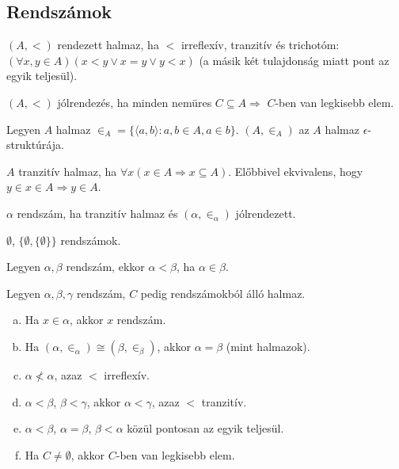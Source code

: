 \subsection{Rendszámok}
\begin{defi}
$(A, <)$ rendezett halmaz, ha $<$ irreflexív, tranzitív és trichotóm: $(\forall x,y \in A) (x < y \lor x = y \lor y < x)$ (a másik két tulajdonság miatt pont az egyik teljesül).
\end{defi}
\begin{defi}
$(A, <)$ jólrendezés, ha minden nemüres $C \subseteq A \Rightarrow$ $C$-ben van legkisebb elem.
\end{defi}
\begin{defi} Legyen $A$ halmaz $\in_{A} = \lbrace \langle a, b \rangle : a, b \in A, a \in b \rbrace$. $(A,\in_A)$ az $A$ halmaz $\epsilon$-struktúrája.
\end{defi}
\begin{defi}
$A$ tranzitív halmaz, ha $\forall x (x \in A \Rightarrow x \subseteq A)$. Előbbivel ekvivalens, hogy $y \in x \in A \Rightarrow y \in A$.
\end{defi}
\begin{defi} $\alpha$ rendszám, ha tranzitív halmaz és $(\alpha, \in_\alpha)$ jólrendezett.
\end{defi}
\begin{exmpl} $\emptyset$, $\lbrace \emptyset, \lbrace \emptyset \rbrace \rbrace$ rendszámok.
\end{exmpl}
\begin{defi} Legyen $\alpha, \beta$ rendszám, ekkor $\alpha < \beta$, ha $\alpha \in \beta$.
\end{defi}
\begin{theo} Legyen $\alpha, \beta, \gamma$ rendszám, $C$ pedig rendszámokból álló halmaz.
\begin{enumerate}[(a)]
\item Ha $x \in \alpha$, akkor $x$ rendszám.
\item Ha $(\alpha, \in_\alpha) \cong (\beta, \in_\beta)$, akkor $\alpha = \beta$ (mint halmazok).
\item $\alpha \not < \alpha$, azaz $<$ irreflexív.
\item $\alpha < \beta$, $\beta < \gamma$, akkor $\alpha < \gamma$, azaz $<$ tranzitív.
\item $\alpha < \beta$, $\alpha = \beta$, $\beta < \alpha$ közül pontosan az egyik teljesül.
\item Ha $C \neq \emptyset$, akkor $C$-ben van legkisebb elem.
\end{enumerate}
\end{theo}
